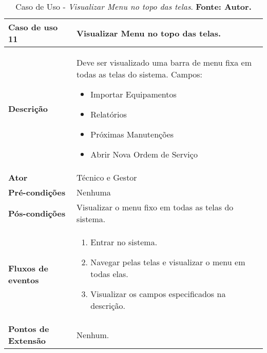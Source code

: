\begin{apendicesenv}

\begin{table}[H]
\centering
\caption{Caso de Uso - \textit{Visualizar Menu no topo das telas}. \textbf{Fonte: Autor.}}
\label{uc11}
\begin{tabular}{ | p{5cm} | p{10cm} |  }
\hline
	\textbf{Caso de uso 11} & Visualizar Menu no topo das telas. \\ \hline
	\textbf{Descrição} & Deve ser visualizado uma barra de menu fixa em todas as telas do sistema. Campos: \begin{itemize}
															                    \item Importar Equipamentos
															                    \item Relatórios
															                    \item Próximas Manutenções
															                    \item Abrir Nova Ordem de Serviço
															                    \end{itemize} \\ \hline
	\textbf{Ator} & Técnico e Gestor \\ \hline
	\textbf{Pré-condições} & Nenhuma \\ \hline
	\textbf{Pós-condições} & Visualizar o menu fixo em todas as telas do sistema. \\ \hline
	\textbf{Fluxos de eventos} & \begin{enumerate}
									\item Entrar no sistema.  
									\item Navegar pelas telas e visualizar o menu em todas elas.
									\item Visualizar os campos especificados na descrição.
								 \end{enumerate}   \\ \hline
	\textbf{Pontos de Extensão} & Nenhum. \\ \hline
\end{tabular}
\end{table}



\end{apendicesenv}
